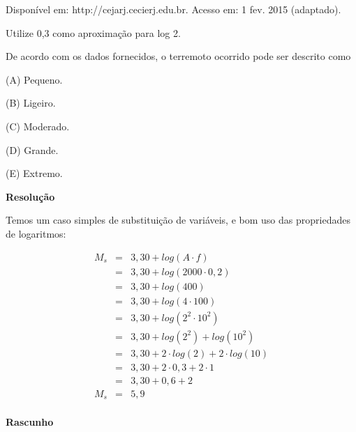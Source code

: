 {\scriptsize 
    \begin{flushright}
        Disponível em: http://cejarj.cecierj.edu.br. Acesso em: 1 fev. 2015 (adaptado). 
    \end{flushright}
}

Utilize 0,3 como aproximação para log 2. 

De acordo com os dados fornecidos, o terremoto ocorrido pode ser descrito como

(A) Pequeno.

(B) Ligeiro.

(C) Moderado.

(D) Grande.

(E) Extremo.



\textbf{Resolução}

Temos um caso simples de substituição de variáveis, e bom uso das propriedades de logaritmos:


\begin{eqnarray*}
    M_{s} 	&=& 3,30 + log(A \cdot f) \\
            &=& 3,30 + log(2000 \cdot 0,2) \\
            &=& 3,30 + log(400) \\
            &=& 3,30 + log(4 \cdot 100) \\
            &=& 3,30 + log(2^{2} \cdot 10^{2}) \\
            &=& 3,30 + log(2^{2}) + log(10^{2}) \\
            &=& 3,30 + 2 \cdot log(2) + 2 \cdot log(10) \\
            &=& 3,30 + 2 \cdot 0,3 + 2 \cdot 1 \\
            &=& 3,30 + 0,6 + 2 \\
      M_{s} &=& 5,9 \\
\end{eqnarray*}


\textbf{Rascunho}





\quad

